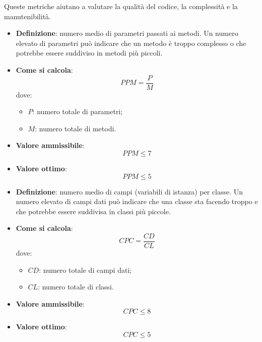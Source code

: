 Queste metriche aiutano a valutare la qualità del codice, la complessità e la manutenibilità.

\hypertarget{15M}{}
\begin{itemize}
	\item \textbf{Definizione}: numero medio di parametri passati ai metodi. Un numero elevato di parametri può indicare che un metodo è troppo complesso o che potrebbe essere suddiviso in metodi più piccoli.
	\item \textbf{Come si calcola}: \begin{equation*}PPM = \frac{P}{M}\end{equation*} dove:
		\begin{itemize}
			\item $P$: numero totale di parametri;
			\item $M$: numero totale di metodi.
		\end{itemize}
	\item \textbf{Valore ammissibile}: \begin{equation*}PPM \leq 7\end{equation*}
	\item \textbf{Valore ottimo}: \begin{equation*}PPM \leq 5\end{equation*}
\end{itemize}

\hypertarget{16M}{}
\begin{itemize}
	\item \textbf{Definizione}: numero medio di campi (variabili di istanza) per classe. Un numero elevato di campi dati può indicare che una classe sta facendo troppo e che potrebbe essere suddivisa in classi più piccole.
	\item \textbf{Come si calcola}: \begin{equation*}CPC = \frac{CD}{CL}\end{equation*} dove:
		\begin{itemize}
			\item $CD$: numero totale di campi dati;
			\item $CL$: numero totale di classi.
		\end{itemize}
	\item \textbf{Valore ammissibile}: \begin{equation*}CPC \leq 8\end{equation*}
	\item \textbf{Valore ottimo}: \begin{equation*}CPC \leq 5\end{equation*}
\end{itemize}

